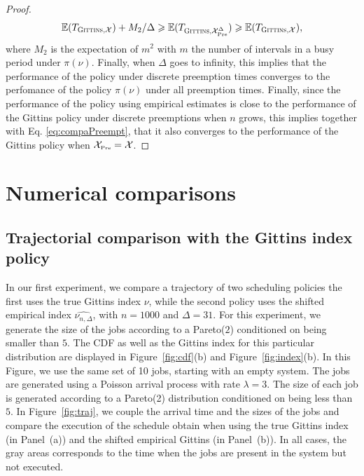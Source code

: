\documentclass[11pt]{article}
\renewcommand{\geq}{\geqslant}
\newcommand{\cX}{\mathcal{X}}
\newcommand{\XP}{\mathcal{X}_{\mbox{\tiny Pre}}}
\begin{document}
\begin{proof}
  \begin{equation}
    \mathbb{E}(T_{\textsc{Gittins},\cX})  + M_2/\Delta \geq \mathbb{E}(T_{\textsc{Gittins},\XP^\Delta}) \geq 
    \mathbb{E}(T_{\textsc{Gittins},\cX}), \label{eq:compaPreempt}
    \end{equation}
where $M_2$ is the expectation of $m^2$ with $m$ the number of intervals in a busy period under  $\pi(\nu)$.
Finally, when $\Delta$ goes to infinity, this implies that the performance of the policy under discrete preemption times  converges to the perfomance  of the  policy $\pi(\nu)$ under all preemption times.
Finally, since  the performance of the policy using empirical estimates is close to the  performance of the Gittins policy under discrete preemptions when $n$ grows, this implies together with Eq. \eqref{eq:compaPreempt}, that it also converges to the performance of the Gittins policy when $\XP = \cX$.
\end{proof}
  
\section{Numerical comparisons}
\label{sec:numerical}

\subsection{Trajectorial comparison with the Gittins index policy}

In our first experiment, we compare a trajectory of two scheduling policies the first uses the true Gittins index $\nu$, while the second policy uses the shifted empirical index $\widehat{\nu_{n,\Delta}}$, with $n = 1000$ and $\Delta = 31$. For this experiment, we generate the size of the jobs according to a Pareto($2$) conditioned on being smaller than $5$. The CDF as well as the Gittins index for this particular distribution are displayed in Figure~\ref{fig:cdf}(b) and Figure~\ref{fig:index}(b).  In this Figure, we use the same set of 10 jobs, starting with an empty system. The jobs are generated using a Poisson arrival process with rate $\lambda = 3$. The size of each job is generated according to a Pareto(2) distribution conditioned on being less than $5$. In Figure~\ref{fig:traj}, we couple the arrival time and the sizes of the jobs and compare the execution of the schedule obtain when using the true Gittins index (in Panel~(a)) and the shifted empirical Gittins (in Panel~(b)). In all cases, the gray areas corresponds to the time when the jobs are present in the system but not executed. 
\end{document}
